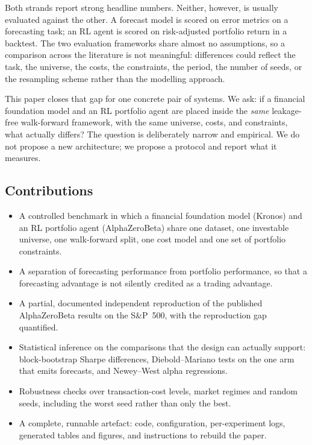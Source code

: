 \documentclass[conference]{IEEEtran}
\begin{document}
Both strands report strong headline numbers. Neither, however, is usually
evaluated against the other. A forecast model is scored on error metrics on a
forecasting task; an RL agent is scored on risk-adjusted portfolio return in a
backtest. The two evaluation frameworks share almost no assumptions, so a
comparison across the literature is not meaningful: differences could reflect
the task, the universe, the costs, the constraints, the period, the number of
seeds, or the resampling scheme rather than the modelling approach.

This paper closes that gap for one concrete pair of systems. We ask: if a
financial foundation model and an RL portfolio agent are placed inside the
\emph{same} leakage-free walk-forward framework, with the same universe, costs,
and constraints, what actually differs? The question is deliberately narrow and
empirical. We do not propose a new architecture; we propose a protocol and
report what it measures.

\subsection*{Contributions}
\begin{itemize}
\item A controlled benchmark in which a financial foundation model (Kronos) and
an RL portfolio agent (AlphaZeroBeta) share one dataset, one investable
universe, one walk-forward split, one cost model and one set of portfolio
constraints.
\item A separation of forecasting performance from portfolio performance, so
that a forecasting advantage is not silently credited as a trading advantage.
\item A partial, documented independent reproduction of the published
AlphaZeroBeta results on the S\&P~500, with the reproduction gap quantified.
\item Statistical inference on the comparisons that the design can actually
support: block-bootstrap Sharpe differences, Diebold--Mariano tests on the
one arm that emits forecasts, and Newey--West alpha regressions.
\item Robustness checks over transaction-cost levels, market regimes and random
seeds, including the worst seed rather than only the best.
\item A complete, runnable artefact: code, configuration, per-experiment logs,
generated tables and figures, and instructions to rebuild the paper.
\end{itemize}
\end{document}
